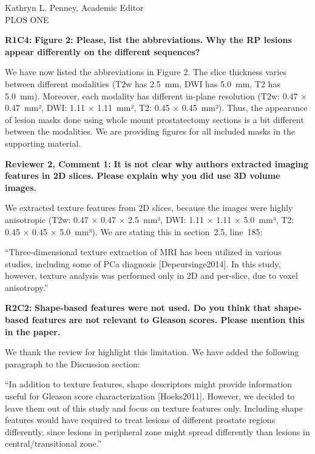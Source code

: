 \documentclass{letter}
\newenvironment{comment}[1]%
  {\vspace{5ex}\par\textbf{#1:}\ignorespaces\bfseries}%
  {\par\ignorespacesafterend}
\newenvironment{reply}%
  {\vspace{2ex}\par}%
  {\par\upshape}
\providecommand{\citep}[1]{[#1]}
\begin{document}
\begin{letter}{Kathryn L. Penney, Academic Editor \\ PLOS ONE}
\begin{comment}{R1C4}
Figure 2: Please, list the abbreviations. Why the RP lesions appear differently
on the different sequences?
\end{comment}

\begin{reply}
We have now listed the abbreviations in Figure 2. The slice thickness varies between different modalities (T2w has 2.5~mm, DWI has 5.0~mm, T2 has 5.0~mm). Moreover, each modality has different in-plane resolution (T2w: 0.47 × 0.47~mm², DWI: 1.11 × 1.11~mm², T2: 0.45 × 0.45~mm²). Thus, the appearance of lesion masks done using whole mount prostatectomy sections is a bit different between the modalities. We are providing figures for all included masks in the supporting material.  
\end{reply}


\begin{comment}{Reviewer 2, Comment 1}
It is not clear why authors extracted imaging features in 2D slices. Please
explain why you did use 3D volume images.
\end{comment}

\begin{reply}
We extracted texture features from 2D slices, because the images were highly
anisotropic (T2w: 0.47 × 0.47 × 2.5~mm³, DWI: 1.11 × 1.11 × 5.0~mm³, T2: 0.45 × 0.45 × 5.0~mm³). We are stating this in section~2.5, line~185:

``Three-dimensional texture extraction of MRI has been utilized in various studies, including some of PCa diagnosis [Depeursinge2014]. In this study, however, texture analysis was performed only in 2D and per-slice, due to voxel anisotropy.''
\end{reply}


\begin{comment}{R2C2}
Shape-based features were not used. Do you think that shape-based features are
not relevant to Gleason scores. Please mention this in the paper.
\end{comment}

\begin{reply}
We thank the review for highlight this limitation. We have  added the following paragraph to the Discussion section:

``In addition to texture features, shape descriptors might provide information
useful for Gleason score characterization \citep{Hoeks2011}. However, we decided
to leave them out of this study and focus on texture features only. Including
shape features would have required to treat lesions of different prostate regions differently, since lesions in peripheral zone might spread differently than lesions in central/transitional zone.''
\end{reply}



\end{letter}
\end{document}
